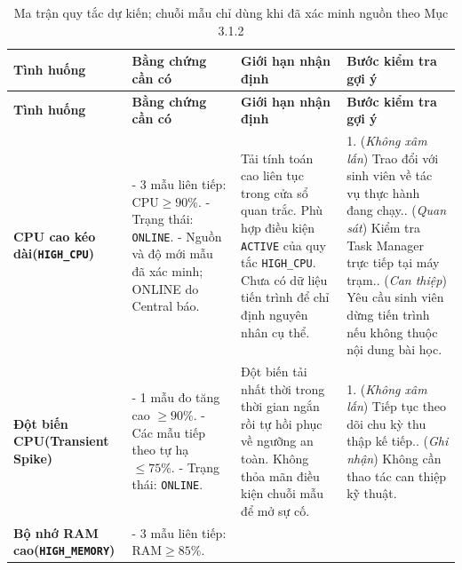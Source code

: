\documentclass[12pt,a4paper]{article}
\begin{document}
\begingroup
\fontsize{10.5}{12.6}\selectfont
\setlength{\tabcolsep}{4pt}
\begin{longtable}{|p{}|p{}|p{}|p{}|}
\caption{Ma trận quy tắc dự kiến; chuỗi mẫu chỉ dùng khi đã xác minh nguồn theo Mục 3.1.2}\label{tab:ma-tran-quy-tac}\\ \hline
\rowcolor{lgDeepBlue}
\color{white}\textbf{Tình huống} & \color{white}\textbf{Bằng chứng cần có} & \color{white}\textbf{Giới hạn nhận định} & \color{white}\textbf{Bước kiểm tra gợi ý} \\ \hline
\endfirsthead
\hline
\rowcolor{lgDeepBlue}
\color{white}\textbf{Tình huống} & \color{white}\textbf{Bằng chứng cần có} & \color{white}\textbf{Giới hạn nhận định} & \color{white}\textbf{Bước kiểm tra gợi ý} \\ \hline
\endhead
\endfoot
    \textbf{CPU cao kéo dài\newline(\texttt{HIGH\_CPU})} &
    - 3 mẫu liên tiếp: $\text{CPU} \ge 90\%$.\newline
    - Trạng thái: \texttt{ONLINE}.\newline
    - Nguồn và độ mới mẫu đã xác minh; ONLINE do Central báo. &
    Tải tính toán cao liên tục trong cửa sổ quan trắc. Phù hợp điều kiện \texttt{ACTIVE} của quy tắc \texttt{HIGH\_CPU}. Chưa có dữ liệu tiến trình để chỉ định nguyên nhân cụ thể. &
    1. (\textit{Không xâm lấn}) Trao đổi với sinh viên về tác vụ thực hành đang chạy.\newline
    2. (\textit{Quan sát}) Kiểm tra Task Manager trực tiếp tại máy trạm.\newline
    3. (\textit{Can thiệp}) Yêu cầu sinh viên dừng tiến trình nếu không thuộc nội dung bài học. \\
    \hline
    \textbf{Đột biến CPU\newline(Transient Spike)} &
    - 1 mẫu đo tăng cao $\ge 90\%$.\newline
    - Các mẫu tiếp theo tự hạ $\le 75\%$.\newline
    - Trạng thái: \texttt{ONLINE}. &
    Đột biến tải nhất thời trong thời gian ngắn rồi tự hồi phục về ngưỡng an toàn. Không thỏa mãn điều kiện chuỗi mẫu để mở sự cố. &
    1. (\textit{Không xâm lấn}) Tiếp tục theo dõi chu kỳ thu thập kế tiếp.\newline
    2. (\textit{Ghi nhận}) Không cần thao tác can thiệp kỹ thuật. \\
    \hline
    \textbf{Bộ nhớ RAM cao\newline(\texttt{HIGH\_MEMORY})} &
    - 3 mẫu liên tiếp: $\text{RAM} \ge 85\%$.\newline

\end{longtable}
\end{document}
